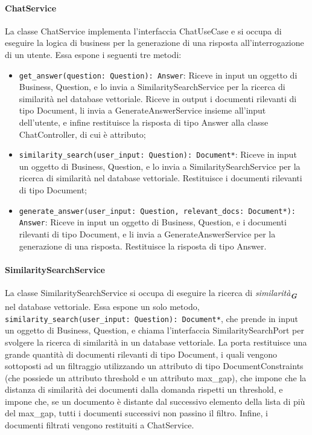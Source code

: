 \paragraph{ChatService}
\label{sec:chat_service}
La classe ChatService implementa l'interfaccia ChatUseCase e si occupa di eseguire la logica di business per la generazione di una risposta all'interrogazione di un utente.
Essa espone i seguenti tre metodi:
\begin{itemize}
    \item \texttt{get\_answer(question: Question): Answer}: Riceve in input un oggetto di Business, Question, e lo invia a SimilaritySearchService per la ricerca di similarità nel database vettoriale. Riceve in output i documenti rilevanti di tipo Document, li invia a GenerateAnswerService insieme all'input dell'utente, e infine restituisce la risposta di tipo Answer alla classe ChatController, di cui è attributo;
    \item \texttt{similarity\_search(user\_input: Question): Document*}: Riceve in input un oggetto di Business, Question, e lo invia a SimilaritySearchService per la ricerca di similarità nel database vettoriale. Restituisce i documenti rilevanti di tipo Document;
    \item \texttt{generate\_answer(user\_input: Question, relevant\_docs: Document*): Answer}: Riceve in input un oggetto di Business, Question, e i documenti rilevanti di tipo Document, e li invia a GenerateAnswerService per la generazione di una risposta. Restituisce la risposta di tipo Answer.
\end{itemize}

\paragraph{SimilaritySearchService}
\label{sec:similarity_search_service}
La classe SimilaritySearchService si occupa di eseguire la ricerca di \emph{similarità}\textsubscript{\textbf{\textit{G}}} nel database vettoriale. Essa espone un solo metodo, \texttt{similarity\_search(user\_input: Question): Document*}, che prende in input un oggetto di Business, Question, e chiama l'interfaccia SimilaritySearchPort per svolgere la ricerca di similarità in un database vettoriale. La porta restituisce una grande quantità di documenti rilevanti di tipo Document, i quali vengono sottoposti ad un filtraggio utilizzando un attributo di tipo DocumentConstraints (che possiede un attributo threshold e un attributo max\_gap), che impone che la distanza di similarità dei documenti dalla domanda rispetti un threshold, e impone che, se un documento è distante dal successivo elemento della lista di più del max\_gap, tutti i documenti successivi non passino il filtro. Infine, i documenti filtrati vengono restituiti a ChatService.

